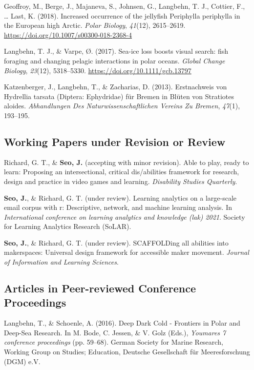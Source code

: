 \documentclass[11pt, a4paper]{awesome-cv}
\begin{document}
\leavevmode\hypertarget{ref-Geoffroy2018}{}%
Geoffroy, M., Berge, J., Majaneva, S., Johnsen, G., Langbehn, T. J.,
Cottier, F., \ldots{} Last, K. (2018). Increased occurrence of the
jellyfish Periphylla periphylla in the European high Arctic. \emph{Polar
Biology}, \emph{41}(12), 2615--2619.
\url{https://doi.org/10.1007/s00300-018-2368-4}

\leavevmode\hypertarget{ref-Langbehn2017}{}%
Langbehn, T. J., \& Varpe, Ø. (2017). Sea-ice loss boosts visual search:
fish foraging and changing pelagic interactions in polar oceans.
\emph{Global Change Biology}, \emph{23}(12), 5318--5330.
\url{https://doi.org/10.1111/gcb.13797}

\leavevmode\hypertarget{ref-Katzenberger2013}{}%
Katzenberger, J., Langbehn, T., \& Zacharias, D. (2013). Erstnachweis
von Hydrellia tarsata (Diptera: Ephydridae) für Bremen in Blüten von
Stratiotes aloides. \emph{Abhandlungen Des Naturwissenschaftlichen
Vereins Zu Bremen}, \emph{47}(1), 193--195.

\hypertarget{working-papers-under-revision-or-review}{%
\subsection{Working Papers under Revision or
Review}\label{working-papers-under-revision-or-review}}

\hypertarget{refs_working_paper}{}
\leavevmode\hypertarget{ref-dsq}{}%
Richard, G. T., \& \textbf{Seo, J.} (accepting with minor revision).
Able to play, ready to learn: Proposing an intersectional, critical
dis/abilities framework for research, design and practice in video games
and learning. \emph{Disability Studies Quarterly}.

\leavevmode\hypertarget{ref-seo2021mboxr}{}%
\textbf{Seo, J.}, \& Richard, G. T. (under review). Learning analytics
on a large-scale email corpus with r: Descriptive, network, and machine
learning analysis. In \emph{International conference on learning
analytics and knowledge (lak) 2021}. Society for Learning Analytics
Research (SoLAR).

\leavevmode\hypertarget{ref-scaffold}{}%
\textbf{Seo, J.}, \& Richard, G. T. (under review). SCAFFOLDing all
abilities into makerspaces: Universal design framework for accessible
maker movement. \emph{Journal of Information and Learning Sciences}.

\hypertarget{articles-in-peer-reviewed-conference-proceedings}{%
\subsection{Articles in Peer-reviewed Conference
Proceedings}\label{articles-in-peer-reviewed-conference-proceedings}}

\hypertarget{refs_proceedings}{}
\leavevmode\hypertarget{ref-Langbehn2016c}{}%
Langbehn, T., \& Schoenle, A. (2016). Deep \textbar{} Dark \textbar{}
Cold - Frontiers in Polar and Deep-Sea Research. In M. Bode, C. Jessen,
\& V. Golz (Eds.), \emph{Youmares 7 conference proceedings} (pp.
59--68). German Society for Marine Research, Working Group on Studies;
Education, Deutsche Gesellschaft für Meeresforschung (DGM) e.V.
\end{document}
